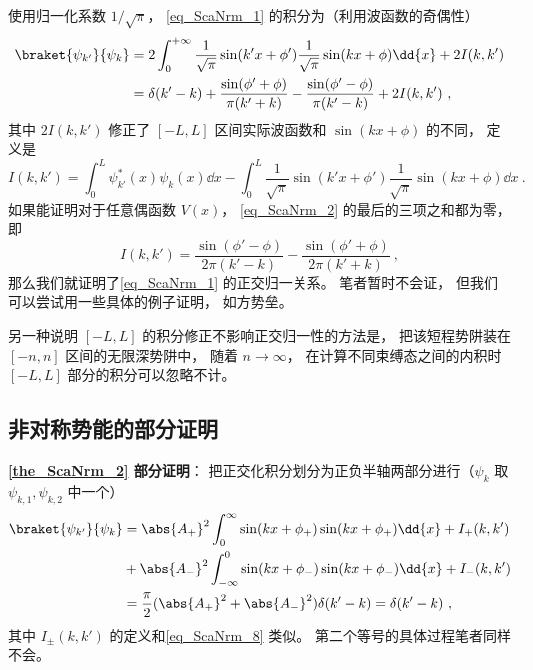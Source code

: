 使用归一化系数 $1/\sqrt{\pi}$， \autoref{eq_ScaNrm_1} 的积分为（利用波函数的奇偶性）
\begin{equation}\label{eq_ScaNrm_2}
\begin{aligned}
\braket{\psi_{k'}}{\psi_k} &= 2\int_{0}^{+\infty} \frac{1}{\sqrt{\pi}}\sin(k'x+\phi')\frac{1}{\sqrt{\pi}}\sin(kx+\phi) \dd{x} + 2I(k,k')\\
&= \delta(k'-k) + \frac{\sin(\phi'+\phi)}{\pi(k'+k)} - \frac{\sin(\phi'-\phi)}{\pi(k'-k)} + 2I(k,k')~,
\end{aligned}
\end{equation}
其中 $2I(k,k')$ 修正了 $[-L,L]$ 区间实际波函数和 $\sin(kx+\phi)$ 的不同， 定义是
\begin{equation}\label{eq_ScaNrm_8}
I(k,k') = \int_0^L \psi_{k'}^*(x) \psi_k(x) \dd{x}
-\int_{0}^{L} \frac{1}{\sqrt{\pi}}\sin(k'x+\phi') \frac{1}{\sqrt{\pi}}\sin(kx+\phi) \dd{x}~.
\end{equation}
如果能证明对于任意偶函数 $V(x)$， \autoref{eq_ScaNrm_2} 的最后的三项之和都为零， 即
\begin{equation}
I(k,k') = \frac{\sin(\phi'-\phi)}{2\pi(k'-k)} - \frac{\sin(\phi'+\phi)}{2\pi(k'+k)}~,
\end{equation}
那么我们就证明了\autoref{eq_ScaNrm_1} 的正交归一关系。 笔者暂时不会证， 但我们可以尝试用一些具体的例子证明， 如方势垒。

另一种说明 $[-L,L]$ 的积分修正不影响正交归一性的方法是， 把该短程势阱装在 $[-n,n]$ 区间的无限深势阱中， 随着 $n\to\infty$， 在计算不同束缚态之间的内积时 $[-L,L]$ 部分的积分可以忽略不计。

\subsection{非对称势能的部分证明}
\textbf{\autoref{the_ScaNrm_2} 部分证明}： 把正交化积分划分为正负半轴两部分进行（$\psi_{k}$ 取 $\psi_{k,1}, \psi_{k,2}$ 中一个）
\begin{equation}
\begin{aligned}
\braket{\psi_{k'}}{\psi_{k}} &=
\abs{A_+}^2\int_0^{\infty} \sin(kx + \phi_{+})\sin(kx + \phi_{+}) \dd{x}   + I_+(k,k')\\
&+ \abs{A_-}^2\int_{-\infty}^0 \sin(kx + \phi_{-})\sin(kx + \phi_{-}) \dd{x} + I_-(k,k')\\
&= \frac{\pi}{2}(\abs{A_+}^2 + \abs{A_-}^2)\delta(k'-k) = \delta(k'-k)~,
\end{aligned}
\end{equation}
其中 $I_{\pm}(k,k')$ 的定义和\autoref{eq_ScaNrm_8} 类似。 第二个等号的具体过程笔者同样不会。

